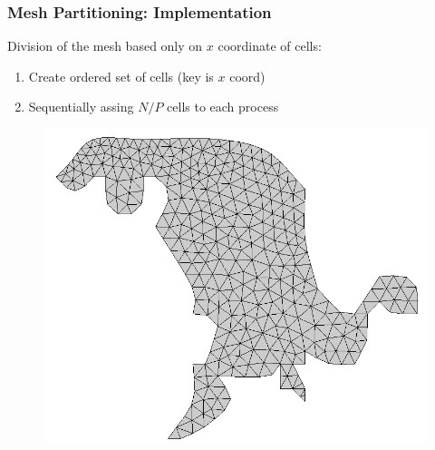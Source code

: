 \documentclass{beamer}
\begin{document}
\begin{frame}
	\frametitle{Mesh Partitioning: Implementation}

	Division of the mesh based only on $x$ coordinate of cells:
	\begin{enumerate}
		\item Create ordered set of cells (key is $x$ coord)
		\item Sequentially assing $N/P$ cells to each process
	\end{enumerate}

	\begin{figure}
		\begin{center}
			\includegraphics[width=0.45\columnwidth]{report.may/images/foz_msh}
		\end{center}
	\end{figure}
\end{frame}
\end{document}
